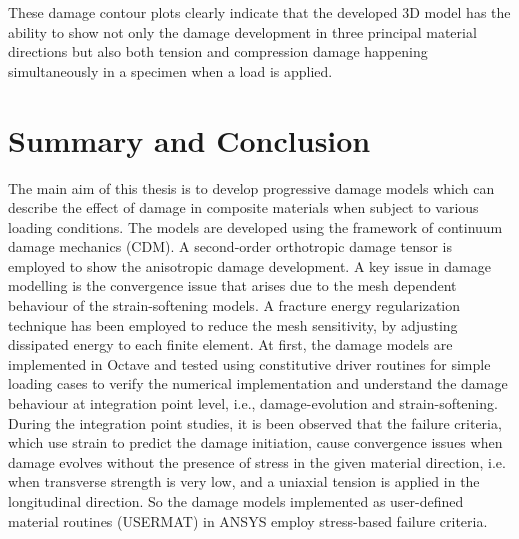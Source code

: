 \documentclass[12pt,a4paper,twoside,openright]{report}
\begin{document}
\indent\indent\indent These damage contour plots clearly indicate that the developed 3D model has the ability to show not only the damage development in three principal material directions but also both tension and compression damage happening simultaneously in a specimen when a load is applied.

\newpage
{} 
\chapter{Summary and Conclusion}
\indent\indent\indent The main aim of this thesis is to develop progressive damage models which can describe the effect of damage in composite materials when subject to various loading conditions. The models are developed using the framework of continuum damage mechanics (CDM). A second-order orthotropic damage tensor is employed to show the anisotropic damage development. A key issue in damage modelling is the convergence issue that arises due to the mesh dependent behaviour of the strain-softening models. A fracture energy regularization technique has been employed to reduce the mesh sensitivity, by adjusting dissipated energy to each finite element. At first, the damage models are implemented in Octave and tested using constitutive driver routines for simple loading cases to verify the numerical implementation and understand the damage behaviour at integration point level, i.e., damage-evolution and strain-softening. During the integration point studies, it is been observed that the failure criteria, which use strain to predict the damage initiation, cause convergence issues when damage evolves without the presence of stress in the given material direction, i.e. when transverse strength is very low, and a uniaxial tension is applied in the longitudinal direction. So the damage models implemented as user-defined material routines (USERMAT) in ANSYS employ stress-based failure criteria.\\ 
\end{document}
